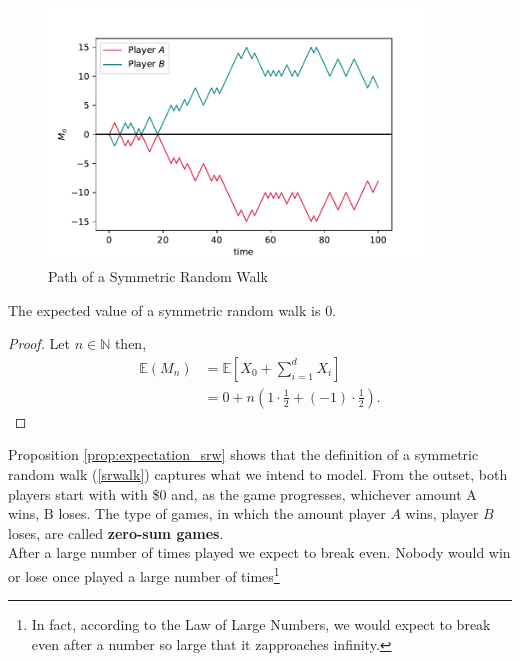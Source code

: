 \documentclass[../TGMAFFIRO]{subfiles}
\begin{document}
\begin{figure}
	\label{fig:symmetric_random_walk}
	\centering
	\includegraphics[width=0.9\textwidth]{../images/symmetric_random_walk}
	\caption{Path of a Symmetric Random Walk}
\end{figure}

\begin{proposition}\label{prop:expectation_srw}
	The expected value of a symmetric random walk is 0.
\end{proposition}

\begin{proof}
	Let $n \in \mathbb{N}$ then,
	\begin{align*}
	\mathbb{E}(M_n) &= \mathbb{E}\left[X_0 + \sum_{i=1}^d X_i\right]\\
				    &= 0 + n  \left( 1 \cdot \frac{1}{2} + (-1) \cdot \frac{1}{2}\right).
	\end{align*}
\end{proof}

Proposition \ref{prop:expectation_srw} shows that the definition of a symmetric random walk (\ref{srwalk}) captures what we intend to model. From the outset, both players start with with \$0 and, as the game progresses, whichever amount A wins, B loses. The type of games, in which the amount player $A$ wins, player $B$ loses, are called \textbf{zero-sum games}.\\

After a large number of times played we expect to break even. Nobody would win or lose once played a large number of times\footnote{In fact, according to the Law of Large Numbers, we would expect to break even after a number so large that it zapproaches infinity.}\\
\end{document}
